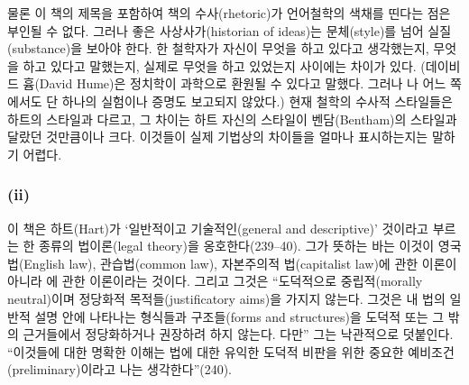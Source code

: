 물론 이 책의 제목을 포함하여 책의 수사(rhetoric)가 언어철학의 색채를
띤다는 점은 부인될 수 없다. 그러나 좋은 사상사가(historian of ideas)는
문체(style)를 넘어 실질(substance)을 보아야 한다. 한 철학자가 자신이
무엇을 하고 있다고 생각했는지, 무엇을 하고 있다고 말했는지, 실제로
무엇을 하고 있었는지 사이에는 차이가 있다. (데이비드 흄(David Hume)은
정치학이 과학으로 환원될 수 있다고 말했다. 그러나
나  어느 쪽에서도 단 하나의
실험이나 증명도 보고되지 않았다.) 현재 철학의 수사적 스타일들은 하트의
스타일과 다르고, 그 차이는 하트 자신의 스타일이 벤담(Bentham)의 스타일과
달랐던 것만큼이나 크다. 이것들이 실제 기법상의 차이들을 얼마나
표시하는지는 말하기 어렵다.

\subsubsection{\texorpdfstring{(ii) }{(ii) 명료화(clarification)와 비판(criticism)}}\label{ii-uxba85uxb8ccuxd654clarificationuxc640-uxbe44uxd310criticism}

이 책은 하트(Hart)가 ‘일반적이고 기술적인(general and descriptive)’
것이라고 부르는 한 종류의 법이론(legal theory)을 옹호한다(239--40). 그가
뜻하는 바는 이것이 영국법(English law), 관습법(common law), 자본주의적
법(capitalist law)에 관한 이론이 아니라  에
관한 이론이라는 것이다. 그리고 그것은 “도덕적으로 중립적(morally
neutral)이며 정당화적 목적들(justificatory aims)을 가지지 않는다. 그것은
내 법의 일반적 설명 안에 나타나는 형식들과 구조들(forms and
structures)을 도덕적 또는 그 밖의 근거들에서 정당화하거나 권장하려 하지
않는다. 다만” 그는 낙관적으로 덧붙인다. “이것들에 대한 명확한 이해는
법에 대한 유익한 도덕적 비판을 위한 중요한 예비조건(preliminary)이라고
나는 생각한다”(240).

